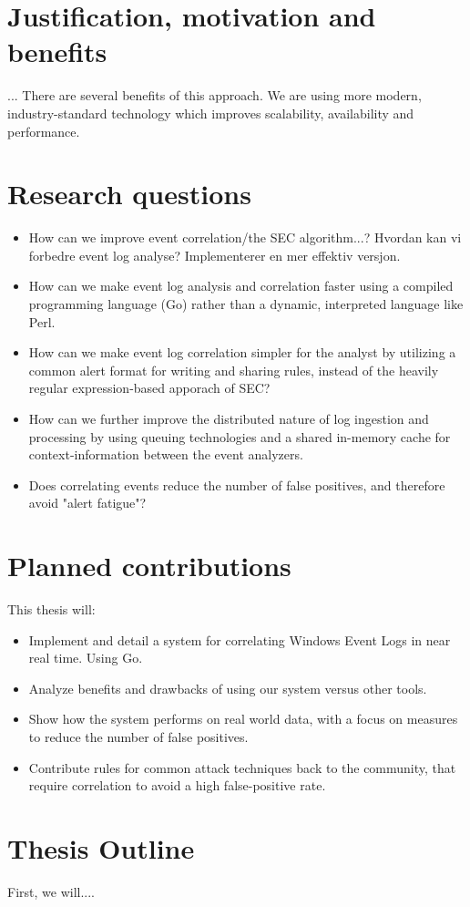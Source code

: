 \section{Justification, motivation and benefits}
\label{sec:justificationmotivationandbenefits}
...
There are several benefits of this approach. We are using more modern, industry-standard technology which improves scalability, availability and performance.

\section{Research questions}
\label{sec:researchquestions}

\begin{itemize}
\item How can we improve event correlation/the SEC algorithm...? Hvordan kan vi forbedre event log analyse?
Implementerer en mer effektiv versjon.
    \item How can we make event log analysis and correlation faster using a compiled programming language (Go) rather than a dynamic, interpreted language like Perl.
    \item How can we make event log correlation simpler for the analyst by utilizing a common alert format for writing and sharing rules, instead of the heavily regular expression-based apporach of SEC?
    \item How can we further improve the distributed nature of log ingestion and processing by using queuing technologies and a shared in-memory cache for context-information between the event analyzers.
    \item Does correlating events reduce the number of false positives, and therefore avoid "alert fatigue"?
\end{itemize}

\section{Planned contributions}
\label{sec:plannedcontributions}

This thesis will:

\begin{itemize}
    \item Implement and detail a system for correlating Windows Event Logs in near real time. Using Go.
    \item Analyze benefits and drawbacks of using our system versus other tools.
    \item Show how the system performs on real world data, with a focus on measures to reduce the number of false positives.
    \item Contribute rules for common attack techniques back to the community, that require correlation to avoid a high false-positive rate.
\end{itemize}


\section{Thesis Outline}
\label{sec:thesisoutline}

First, we will....